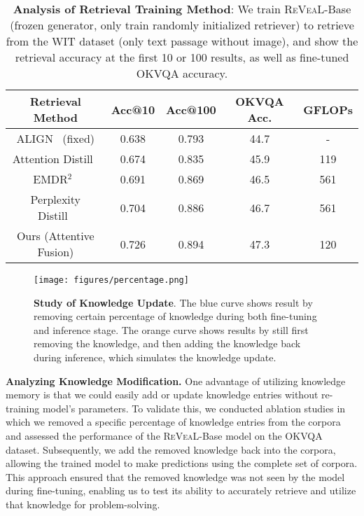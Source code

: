 \documentclass[10pt,twocolumn,letterpaper]{article}
\newcommand{\method}{R\textsc{e}V\textsc{ea}L\xspace}
\begin{document}
{ \setlength\tabcolsep{2pt} 
\begin{table}[t!]
\centering
\footnotesize
\begin{tabular}{c|cc|c|c} \toprule
\textbf{Retrieval Method} & \textbf{Acc@10} & \textbf{Acc@100} & \textbf{OKVQA Acc.} & \textbf{GFLOPs} \\ \midrule
ALIGN~\cite{DBLP:conf/icml/JiaYXCPPLSLD21} (fixed) & 0.638 & 0.793 & 44.7 & -\\ \midrule
Attention Distill~\cite{izacard2020distilling} & 0.674 & 0.835 & 45.9 & 119\\
EMDR$^2$~\cite{DBLP:conf/naacl/YangXLLTXLL19} & 0.691 & 0.869 & 46.5 & 561\\ 
Perplexity Distill~\cite{DBLP:journals/corr/abs-2208-03299} & 0.704 & 0.886 & 46.7 & 561 \\ \midrule
Ours (Attentive Fusion) & 0.726 & 0.894 & 47.3 & 120 \\
\bottomrule
\end{tabular}
\vspace{-.1in}
\caption{\textbf{Analysis of Retrieval Training Method}: We train \method-Base (frozen generator, only train randomly initialized retriever) to retrieve from the WIT dataset (only text passage without image), and show the retrieval accuracy at the first 10 or 100 results, as well as fine-tuned OKVQA accuracy.}
\label{tab:signal}
\end{table}
}  

\begin{figure}[t!]
    \centering
    \texttt{[image: figures/percentage.png]}
    \vspace{-.1in}
    \caption{\textbf{Study of Knowledge Update}. The blue curve shows result by removing certain percentage of knowledge during both fine-tuning and inference stage. The orange curve shows results by still first removing the knowledge, and then adding the knowledge back during inference, which simulates the knowledge update.}
    \label{fig:update}
\end{figure}




\textbf{Analyzing Knowledge Modification.}
One advantage of utilizing knowledge memory is that we could easily add or update knowledge entries without re-training model's parameters. To validate this, we conducted ablation studies in which we removed a specific percentage of knowledge entries from the corpora and assessed the performance of the \method-Base model on the OKVQA dataset. Subsequently, we add the removed knowledge back into the corpora, allowing the trained model to make predictions using the complete set of corpora. This approach ensured that the removed knowledge was not seen by the model during fine-tuning, enabling us to test its ability to accurately retrieve and utilize that knowledge for problem-solving.
\end{document}
